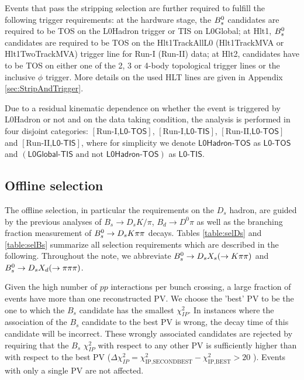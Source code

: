 Events that pass the stripping selection are further required to fulfill the following trigger requirements:
at the hardware stage, the ${{B}^0_{s}}$ candidates are required to be TOS on the \textsf{L0Hadron} trigger or TIS on \textsf{L0Global};
at Hlt1, ${{B}^0_{s}}$ candidates are required to be TOS on the \textsf{Hlt1TrackAllL0} (\textsf{Hlt1TrackMVA} or \textsf{Hlt1TwoTrackMVA}) trigger line for Run-I (Run-II) data;
at Hlt2, candidates have to be TOS on either one of the 2, 3 or 4-body topological trigger lines or the inclusive $\phi$ trigger. 
More details on the used HLT lines are given in Appendix \ref{sec:StripAndTrigger}.

Due to a residual kinematic dependence on whether the event is triggered by \textsf{L0Hadron} or not and on the data taking condition,
the analysis is performed in four disjoint categories: 
$[\text{Run-I,}\textsf{L0-TOS}]$, $[\text{Run-I,}\textsf{L0-TIS}]$, $ [\text{Run-II,}\textsf{L0-TOS}]$ and $ [\text{Run-II,}\textsf{L0-TIS}]$,
where for simplicity we denote  $\textsf{L0Hadron-TOS}$ as $\textsf{L0-TOS}$ and $ (\textsf{L0Global-TIS} \text{ and not } \textsf{L0Hadron-TOS})$ as $\textsf{L0-TIS}$.
 


\subsection{Offline selection}

The offline selection, in particular the requirements on the $D_s$ hadron, are guided by the previous analyses of 
$B_s \to D_s K/\pi$, $B_d \to D^0 \pi$ as well as the branching fraction measurement of ${{B}^0_{s}}\rightarrow{\ensuremath{{D}_{s}}}{\ensuremath{K}}{\ensuremath{\pi}}{\ensuremath{\pi}}$ decays.
Tables \ref{table:selDs} and \ref{table:selBs} summarize all selection requirements which are described in the following.
Throughout the note, we abbreviate ${{B}^0_{s}}\rightarrow{\ensuremath{{D}_{s}}} X_{s}(\rightarrow{\ensuremath{K}}{\ensuremath{\pi}}{\ensuremath{\pi}})$ and ${{B}^0_{s}}\rightarrow{\ensuremath{{D}_{s}}} X_{d}(\rightarrow{\ensuremath{\pi}}{\ensuremath{\pi}}{\ensuremath{\pi}})$.

Given the high number of $pp$ interactions per bunch crossing, a large fraction
of events have more than one reconstructed PV. 
We choose the 'best' PV to be the one to which the 
$B_s$ candidate has the smallest $\chi^2_{IP}$.
In instances where the association of the $B_s$ candidate to the best PV is wrong,
the decay time of this candidate will be incorrect. 
These wrongly associated candidates
are rejected by requiring that the $B_s$ $\chi^2_{IP}$ with respect to any other PV is sufficiently higher than with respect to the best PV 
($\Delta \chi^2_{IP} = \chi^2_{\text{IP,SECONDBEST}} - \chi^2_{\text{IP,BEST}} > 20$ ).
Events with only a single PV are not affected.

